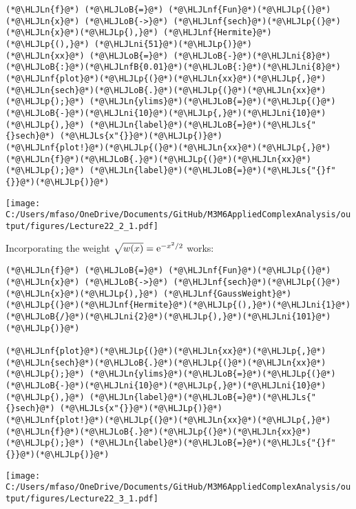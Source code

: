 \documentclass[12pt,landscape]{article}
\newcommand{\HLJLn}[1]{#1}
\newcommand{\HLJLnf}[1]{\textcolor[RGB]{66,102,213}{#1}}
\newcommand{\HLJLs}[1]{\textcolor[RGB]{201,61,57}{#1}}
\newcommand{\HLJLnfB}[1]{\textcolor[RGB]{59,151,46}{#1}}
\newcommand{\HLJLni}[1]{\textcolor[RGB]{59,151,46}{#1}}
\newcommand{\HLJLoB}[1]{\textcolor[RGB]{102,102,102}{\textbf{#1}}}
\newcommand{\HLJLp}[1]{#1}
\def\E{ {\rm e} }
\def\cent#1{\begin{center}#1\end{center} }
\begin{document}
{\begin{lstlisting}
(*@\HLJLn{f}@*) (*@\HLJLoB{=}@*) (*@\HLJLnf{Fun}@*)(*@\HLJLp{(}@*)(*@\HLJLn{x}@*) (*@\HLJLoB{->}@*) (*@\HLJLnf{sech}@*)(*@\HLJLp{(}@*)(*@\HLJLn{x}@*)(*@\HLJLp{),}@*) (*@\HLJLnf{Hermite}@*)(*@\HLJLp{(),}@*) (*@\HLJLni{51}@*)(*@\HLJLp{)}@*)
(*@\HLJLn{xx}@*) (*@\HLJLoB{=}@*) (*@\HLJLoB{-}@*)(*@\HLJLni{8}@*)(*@\HLJLoB{:}@*)(*@\HLJLnfB{0.01}@*)(*@\HLJLoB{:}@*)(*@\HLJLni{8}@*)
(*@\HLJLnf{plot}@*)(*@\HLJLp{(}@*)(*@\HLJLn{xx}@*)(*@\HLJLp{,}@*) (*@\HLJLn{sech}@*)(*@\HLJLoB{.}@*)(*@\HLJLp{(}@*)(*@\HLJLn{xx}@*)(*@\HLJLp{);}@*) (*@\HLJLn{ylims}@*)(*@\HLJLoB{=}@*)(*@\HLJLp{(}@*)(*@\HLJLoB{-}@*)(*@\HLJLni{10}@*)(*@\HLJLp{,}@*)(*@\HLJLni{10}@*)(*@\HLJLp{),}@*) (*@\HLJLn{label}@*)(*@\HLJLoB{=}@*)(*@\HLJLs{"{}sech}@*) (*@\HLJLs{x"{}}@*)(*@\HLJLp{)}@*)
(*@\HLJLnf{plot!}@*)(*@\HLJLp{(}@*)(*@\HLJLn{xx}@*)(*@\HLJLp{,}@*) (*@\HLJLn{f}@*)(*@\HLJLoB{.}@*)(*@\HLJLp{(}@*)(*@\HLJLn{xx}@*)(*@\HLJLp{);}@*) (*@\HLJLn{label}@*)(*@\HLJLoB{=}@*)(*@\HLJLs{"{}f"{}}@*)(*@\HLJLp{)}@*)
\end{lstlisting}

\cent{\texttt{[image: C:/Users/mfaso/OneDrive/Documents/GitHub/M3M6AppliedComplexAnalysis/output/figures/Lecture22\_2\_1.pdf]}}

Incorporating the weight $\sqrt{w(x)} = \E^{-x^2/2}$ works:


\begin{lstlisting}
(*@\HLJLn{f}@*) (*@\HLJLoB{=}@*) (*@\HLJLnf{Fun}@*)(*@\HLJLp{(}@*)(*@\HLJLn{x}@*) (*@\HLJLoB{->}@*) (*@\HLJLnf{sech}@*)(*@\HLJLp{(}@*)(*@\HLJLn{x}@*)(*@\HLJLp{),}@*) (*@\HLJLnf{GaussWeight}@*)(*@\HLJLp{(}@*)(*@\HLJLnf{Hermite}@*)(*@\HLJLp{(),}@*)(*@\HLJLni{1}@*)(*@\HLJLoB{/}@*)(*@\HLJLni{2}@*)(*@\HLJLp{),}@*)(*@\HLJLni{101}@*)(*@\HLJLp{)}@*)

(*@\HLJLnf{plot}@*)(*@\HLJLp{(}@*)(*@\HLJLn{xx}@*)(*@\HLJLp{,}@*) (*@\HLJLn{sech}@*)(*@\HLJLoB{.}@*)(*@\HLJLp{(}@*)(*@\HLJLn{xx}@*)(*@\HLJLp{);}@*) (*@\HLJLn{ylims}@*)(*@\HLJLoB{=}@*)(*@\HLJLp{(}@*)(*@\HLJLoB{-}@*)(*@\HLJLni{10}@*)(*@\HLJLp{,}@*)(*@\HLJLni{10}@*)(*@\HLJLp{),}@*) (*@\HLJLn{label}@*)(*@\HLJLoB{=}@*)(*@\HLJLs{"{}sech}@*) (*@\HLJLs{x"{}}@*)(*@\HLJLp{)}@*)
(*@\HLJLnf{plot!}@*)(*@\HLJLp{(}@*)(*@\HLJLn{xx}@*)(*@\HLJLp{,}@*) (*@\HLJLn{f}@*)(*@\HLJLoB{.}@*)(*@\HLJLp{(}@*)(*@\HLJLn{xx}@*)(*@\HLJLp{);}@*) (*@\HLJLn{label}@*)(*@\HLJLoB{=}@*)(*@\HLJLs{"{}f"{}}@*)(*@\HLJLp{)}@*)
\end{lstlisting}

\cent{\texttt{[image: C:/Users/mfaso/OneDrive/Documents/GitHub/M3M6AppliedComplexAnalysis/output/figures/Lecture22\_3\_1.pdf]}}

}
\end{document}
